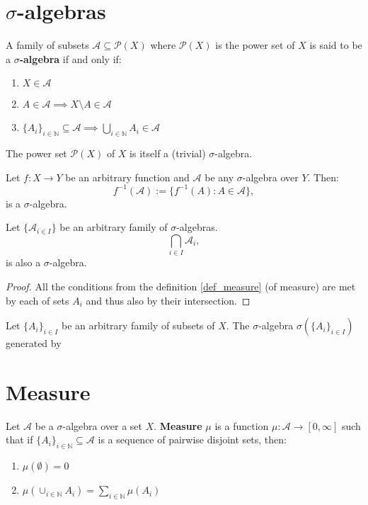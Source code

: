 \documentclass[../main.tex]{subfiles}
\begin{document}
\section{$\sigma$-algebras}

\begin{definition}\label{def_measure}
A family of subsets $\mathcal{A}\subseteq\mathcal{P}(X)$ where $\mathcal{P}(X)$ is the power set of $X$ is said to be a \textbf{$\sigma$-algebra} if and only if:
\begin{enumerate}
    \item $X\in\mathcal{A}$
    \item $A\in\mathcal{A}\implies X\setminus A\in\mathcal{A}$
    \item $\{A_i\}_{i\in\mathbb{N}}\subseteq\mathcal{A}\implies\bigcup_{i\in\mathbb{N}}A_i\in\mathcal{A}$
\end{enumerate}
\end{definition}

\begin{example}
The power set $\mathcal{P}(X)$ of $X$ is itself a (trivial) $\sigma$-algebra.
\end{example}

\begin{example}
Let $f:X\to Y$ be an arbitrary function and $\mathcal{A}$ be any $\sigma$-algebra over $Y$. Then:
\[
    f^{-1}(\mathcal{A}):=\{f^{-1}(A):A\in\mathcal{A}\},
\]
is a $\sigma$-algebra.
\end{example}

\begin{proposition}
Let $\{\mathcal{A}_{i\in I}\}$ be an arbitrary family of $\sigma$-algebras.
\[
\bigcap_{i\in I}\mathcal{A}_i,
\]
is also a $\sigma$-algebra.
\end{proposition}

\begin{proof}
All the conditions from the definition \ref{def_measure} (of measure) are met by each of sets $A_i$ and thus also by their intersection.
\end{proof}

\begin{definition}
Let $\{A_i\}_{i\in I}$ be an arbitrary family of subsets of $X$. The $\sigma$-algebra $\sigma(\{A_i\}_{i\in I})$ generated by 
\end{definition}

\section{Measure}

\begin{definition}
Let $\mathcal{A}$ be a $\sigma$-algebra over a set $X$. \textbf{Measure} $\mu$ is a function $\mu:\mathcal{A}\to[0,\infty]$ such that if $\{A_i\}_{i\in\mathbb{N}}\subseteq\mathcal{A}$ is a sequence of pairwise disjoint sets, then:

\begin{enumerate}
\item $\mu(\emptyset) = 0$
\item $\mu(\cup_{i\in\mathbb{N}}A_i) = \sum_{i\in\mathbb{N}}\mu(A_i)$
\end{enumerate}

\end{definition}
\end{document}
